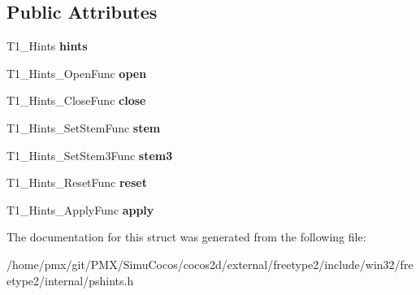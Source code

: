 \subsection*{Public Attributes}
\begin{DoxyCompactItemize}
\item 
\mbox{\label{structT1__Hints__FuncsRec___a6a58f489e362b746703b4caae91349ef}} 
T1\+\_\+\+Hints {\bfseries hints}
\item 
\mbox{\label{structT1__Hints__FuncsRec___a41ca09a042c8e92f64822f19486a622a}} 
T1\+\_\+\+Hints\+\_\+\+Open\+Func {\bfseries open}
\item 
\mbox{\label{structT1__Hints__FuncsRec___aa6d879215bff42f4b3851a9151c78505}} 
T1\+\_\+\+Hints\+\_\+\+Close\+Func {\bfseries close}
\item 
\mbox{\label{structT1__Hints__FuncsRec___abdbf955a1fc9b19799ed8ea8137c9381}} 
T1\+\_\+\+Hints\+\_\+\+Set\+Stem\+Func {\bfseries stem}
\item 
\mbox{\label{structT1__Hints__FuncsRec___acc1edae831d279929f93c8eb1872daa3}} 
T1\+\_\+\+Hints\+\_\+\+Set\+Stem3\+Func {\bfseries stem3}
\item 
\mbox{\label{structT1__Hints__FuncsRec___a5646878cdabd593389e28cffd8b077cb}} 
T1\+\_\+\+Hints\+\_\+\+Reset\+Func {\bfseries reset}
\item 
\mbox{\label{structT1__Hints__FuncsRec___a3fb5f01de31da9efb2ae8f5251b4d506}} 
T1\+\_\+\+Hints\+\_\+\+Apply\+Func {\bfseries apply}
\end{DoxyCompactItemize}


The documentation for this struct was generated from the following file\+:\begin{DoxyCompactItemize}
\item 
/home/pmx/git/\+P\+M\+X/\+Simu\+Cocos/cocos2d/external/freetype2/include/win32/freetype2/internal/pshints.\+h\end{DoxyCompactItemize}

